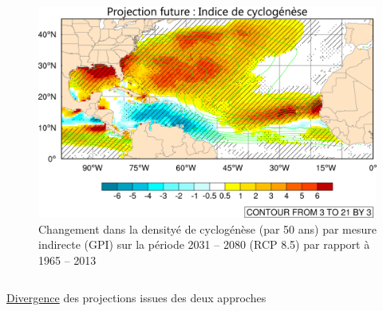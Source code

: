\documentclass[aspectratio=169, usepdftitle=false, xcolor={dvipsnames}, 9pt,table]{beamer}
\begin{document}
\begin{frame}[t]
\begin{columns}[b]
\begin{column}{0.5\textwidth}
            \begin{figure}[h]
                \centering
                \includegraphics[width=\textwidth]{Figures/gpi_fitted_2_good_title2.png}
                \caption{\scriptsize Changement dans la densityé de cyclogénèse (par 50 ans) par mesure \mbox{\alert{indirecte}} (GPI) sur la période 2031 --
                2080 (RCP 8.5) par rapport à 1965 -- 2013 \mbox{\parencite{chauvin_future_2020}}}
            \end{figure}
        \end{column}
    \end{columns}
    \begin{center}
        \vspace{-1ex}
        \begin{minipage}{7cm}
            \begin{alertblock}
                \centering
                \footnotesize
                \underline{\alert{Divergence}} des projections issues des deux approches
            \end{alertblock}
        \end{minipage}
    \end{center}
\end{frame}
\end{document}
